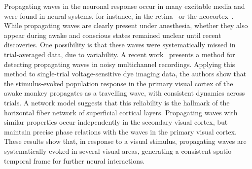 \documentclass[brainsci, %
               review,accept,pdftex,moreauthors
               ]{Definitions/mdpi}
\begin{document}
Propagating waves in the neuronal response occur in many excitable media and were found in neural systems, for instance, in the retina~\citep{feller_dynamic_1997} or the neocortex~\citep{bienenstock_model_1995}. While propagating waves are clearly present under anesthesia, whether they also appear during awake and conscious states remained unclear until recent discoveries. One possibility is that these waves were systematically missed in trial-averaged data, due to variability. A recent work~\citep{muller_stimulus-evoked_2014} presents a method for detecting propagating waves in noisy multichannel recordings. Applying this method to single-trial voltage-sensitive dye imaging data, the authors show that the stimulus-evoked population response in the primary visual cortex of the awake monkey propagates as a travelling wave, with consistent dynamics across trials. A network model suggests that this reliability is the hallmark of the horizontal fiber network of superficial cortical layers. Propagating waves with similar properties occur independently in the secondary visual cortex, but maintain precise phase relations with the waves in the primary visual cortex. These results show that, in response to a visual stimulus, propagating waves are systematically evoked in several visual areas, generating a consistent spatio-temporal frame for further neural interactions.
\end{document}
